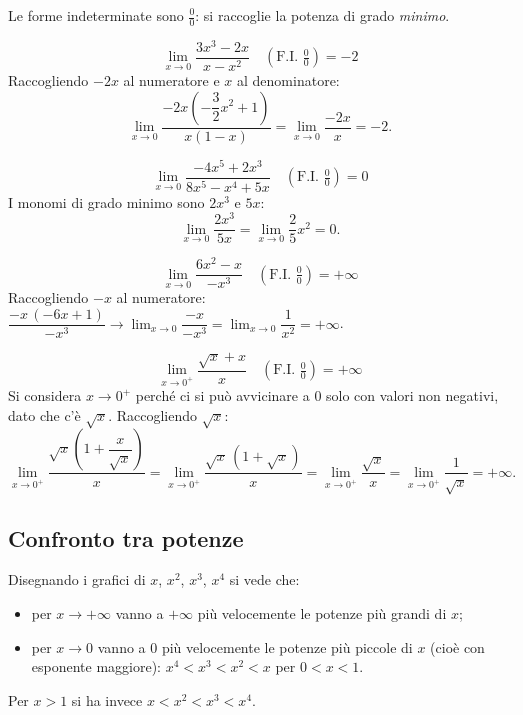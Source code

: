 \documentclass[11pt,a4paper]{article}
\begin{document}
Le forme indeterminate sono $\frac{0}{0}$: si raccoglie la potenza di grado \emph{minimo}.

\begin{esempio}
\[
\lim_{x\to 0}\frac{3x^3 - 2x}{x - x^2} \quad (\text{F.I. } \tfrac{0}{0}) = -2
\]
Raccogliendo $-2x$ al numeratore e $x$ al denominatore:
\[
\lim_{x\to 0}\frac{-2x\left(-\dfrac{3}{2}x^2 + 1\right)}{x(1 - x)} = \lim_{x\to 0}\frac{-2x}{x} = -2 .
\]
\end{esempio}

\begin{esempio}
\[
\lim_{x\to 0}\frac{-4x^5 + 2x^3}{8x^5 - x^4 + 5x} \quad (\text{F.I. } \tfrac{0}{0}) = 0
\]
I monomi di grado minimo sono $2x^3$ e $5x$:
\[
\lim_{x\to 0}\frac{2x^3}{5x} = \lim_{x\to 0}\frac{2}{5}x^2 = 0 .
\]
\end{esempio}

\begin{esempio}
\[
\lim_{x\to 0}\frac{6x^2 - x}{-x^3} \quad (\text{F.I. } \tfrac{0}{0}) = +\infty
\]
Raccogliendo $-x$ al numeratore: $\dfrac{-x\,(-6x + 1)}{-x^3} \to \lim_{x\to 0}\dfrac{-x}{-x^3} = \lim_{x\to 0}\dfrac{1}{x^2} = +\infty$.
\end{esempio}

\begin{esempio}
\[
\lim_{x\to 0^+}\frac{\sqrt{x} + x}{x} \quad (\text{F.I. } \tfrac{0}{0}) = +\infty
\]
Si considera $x \to 0^+$ perché ci si può avvicinare a $0$ solo con valori non negativi, dato che c'è $\sqrt{x}$. Raccogliendo $\sqrt x$:
\[
\lim_{x\to 0^+}\frac{\sqrt{x}\left(1 + \dfrac{x}{\sqrt{x}}\right)}{x} = \lim_{x\to 0^+}\frac{\sqrt{x}\,(1 + \sqrt{x})}{x} = \lim_{x\to 0^+}\frac{\sqrt{x}}{x} = \lim_{x\to 0^+}\frac{1}{\sqrt{x}} = +\infty .
\]
\end{esempio}

\subsection{Confronto tra potenze}

Disegnando i grafici di $x$, $x^2$, $x^3$, $x^4$ si vede che:
\begin{itemize}
    \item per $x \to +\infty$ vanno a $+\infty$ più velocemente le potenze più grandi di $x$;
    \item per $x \to 0$ vanno a $0$ più velocemente le potenze più piccole di $x$ (cioè con esponente maggiore): $x^4 < x^3 < x^2 < x$ per $0 < x < 1$.
\end{itemize}
Per $x > 1$ si ha invece $x < x^2 < x^3 < x^4$.
\end{document}
